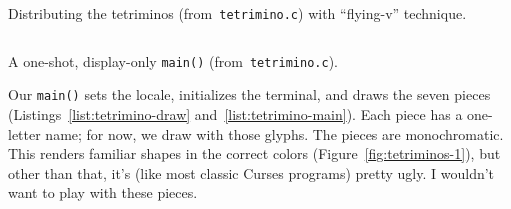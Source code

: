 \begin{listing}[!htbp]
\inputminted[]{C}{code/tetrimino-draw.h}
\caption{Distributing the tetriminos (from~\texttt{tetrimino.c}) with ``flying-v'' technique.}
\label{list:tetrimino-draw}
\end{listing}

\begin{listing}[!htbp]
\inputminted[]{C}{code/tetrimino-main.h}
\caption{A one-shot, display-only \texttt{main()} (from~\texttt{tetrimino.c}).}
\label{list:tetrimino-main}
\end{listing}

Our \texttt{main()} sets the locale, initializes the terminal, and draws the
seven pieces (Listings~\ref{list:tetrimino-draw} and~\ref{list:tetrimino-main}).
Each piece has a one-letter name; for now, we draw with those glyphs. The
pieces are monochromatic. This renders familiar shapes in the correct colors
(Figure~\ref{fig:tetriminos-1}), but other than that, it's (like most classic
Curses programs) pretty ugly. I wouldn't want to play with these pieces.

